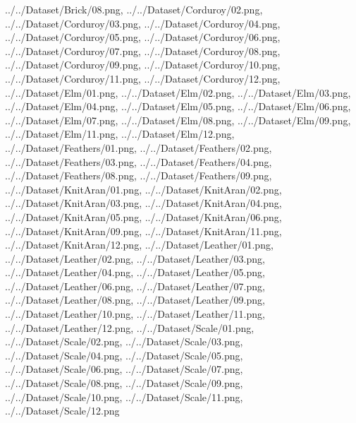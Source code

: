 \documentclass[12pt,a4paper]{article}
\begin{document}
\begin{singlespace}
{../../Dataset/Brick/08.png,
../../Dataset/Corduroy/02.png,
../../Dataset/Corduroy/03.png,
../../Dataset/Corduroy/04.png,
../../Dataset/Corduroy/05.png,
../../Dataset/Corduroy/06.png,
../../Dataset/Corduroy/07.png,
../../Dataset/Corduroy/08.png,
../../Dataset/Corduroy/09.png,
../../Dataset/Corduroy/10.png,
../../Dataset/Corduroy/11.png,
../../Dataset/Corduroy/12.png,
../../Dataset/Elm/01.png,
../../Dataset/Elm/02.png,
../../Dataset/Elm/03.png,
../../Dataset/Elm/04.png,
../../Dataset/Elm/05.png,
../../Dataset/Elm/06.png,
../../Dataset/Elm/07.png,
../../Dataset/Elm/08.png,
../../Dataset/Elm/09.png,
../../Dataset/Elm/11.png,
../../Dataset/Elm/12.png,
../../Dataset/Feathers/01.png,
../../Dataset/Feathers/02.png,
../../Dataset/Feathers/03.png,
../../Dataset/Feathers/04.png,
../../Dataset/Feathers/08.png,
../../Dataset/Feathers/09.png,
../../Dataset/KnitAran/01.png,
../../Dataset/KnitAran/02.png,
../../Dataset/KnitAran/03.png,
../../Dataset/KnitAran/04.png,
../../Dataset/KnitAran/05.png,
../../Dataset/KnitAran/06.png,
../../Dataset/KnitAran/09.png,
../../Dataset/KnitAran/11.png,
../../Dataset/KnitAran/12.png,
../../Dataset/Leather/01.png,
../../Dataset/Leather/02.png,
../../Dataset/Leather/03.png,
../../Dataset/Leather/04.png,
../../Dataset/Leather/05.png,
../../Dataset/Leather/06.png,
../../Dataset/Leather/07.png,
../../Dataset/Leather/08.png,
../../Dataset/Leather/09.png,
../../Dataset/Leather/10.png,
../../Dataset/Leather/11.png,
../../Dataset/Leather/12.png,
../../Dataset/Scale/01.png,
../../Dataset/Scale/02.png,
../../Dataset/Scale/03.png,
../../Dataset/Scale/04.png,
../../Dataset/Scale/05.png,
../../Dataset/Scale/06.png,
../../Dataset/Scale/07.png,
../../Dataset/Scale/08.png,
../../Dataset/Scale/09.png,
../../Dataset/Scale/10.png,
../../Dataset/Scale/11.png,
../../Dataset/Scale/12.png}


\end{singlespace}
\end{document}

